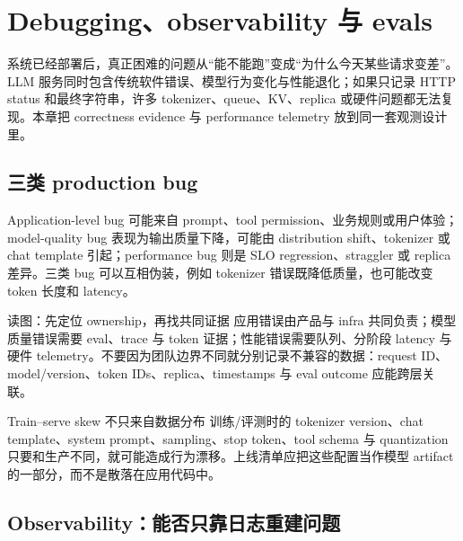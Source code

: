 \section{Debugging、observability 与 evals}

系统已经部署后，真正困难的问题从“能不能跑”变成“为什么今天某些请求变差”。LLM 服务同时包含传统软件错误、模型行为变化与性能退化；如果只记录 HTTP status 和最终字符串，许多 tokenizer、queue、KV、replica 或硬件问题都无法复现。本章把 correctness evidence 与 performance telemetry 放到同一套观测设计里。

\subsection{三类 production bug}

Application-level bug 可能来自 prompt、tool permission、业务规则或用户体验；model-quality bug 表现为输出质量下降，可能由 distribution shift、tokenizer 或 chat template 引起；performance bug 则是 SLO regression、straggler 或 replica 差异。三类 bug 可以互相伪装，例如 tokenizer 错误既降低质量，也可能改变 token 长度和 latency。


\begin{knowledgebox}{读图：先定位 ownership，再找共同证据}
应用错误由产品与 infra 共同负责；模型质量错误需要 eval、trace 与 token 证据；性能错误需要队列、分阶段 latency 与硬件 telemetry。不要因为团队边界不同就分别记录不兼容的数据：request ID、model/version、token IDs、replica、timestamps 与 eval outcome 应能跨层关联。
\end{knowledgebox}


\begin{warningbox}{Train--serve skew 不只来自数据分布}
训练/评测时的 tokenizer version、chat template、system prompt、sampling、stop token、tool schema 与 quantization 只要和生产不同，就可能造成行为漂移。上线清单应把这些配置当作模型 artifact 的一部分，而不是散落在应用代码中。
\end{warningbox}

\subsection{Observability：能否只靠日志重建问题}

